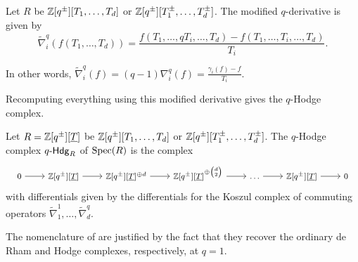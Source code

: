 \begin{definition}\label{def: modified q-derivative}
    Let $R$ be $\mathbb{Z}[q^{\pm}][T_{1},\dots,T_{d}]$ or $\mathbb{Z}[q^{\pm}][T_{1}^{\pm},\dots,T_{d}^{\pm}]$. The modified $q$-derivative is given by 
    $$\widetilde{\nabla}_{i}^{q}(f(T_{1},\dots,T_{d}))=\frac{f(T_{1},\dots,qT_{i},\dots,T_{d})-f(T_{1},\dots,T_{i},\dots,T_{d})}{T_{i}}.$$
\end{definition}
\begin{remark}
    In other words, $\widetilde{\nabla}_{i}^{q}(f)=(q-1)\nabla_{i}^{q}(f)=\frac{\gamma_{i}(f)-f}{T_{i}}$.  
\end{remark}
Recomputing everything using this modified derivative gives the $q$-Hodge complex. 
\begin{definition}\label{def: q-Hodge complex}
    Let $R=\mathbb{Z}[q^{\pm}][\underline{T}]$ be $\mathbb{Z}[q^{\pm}][T_{1},\dots,T_{d}]$ or $\mathbb{Z}[q^{\pm}][T_{1}^{\pm},\dots,T_{d}^{\pm}]$. The $q$-Hodge complex $q\text{-}\mathsf{Hdg}_{R}$ of $\operatorname{Spec}(R)$ is the complex
    \begin{equation}\label{eqn: q-Hodge complex of R}
    \footnotesize
    \begin{tikzcd}
        0 & {\ZZ[q^{\pm}][\underline{T}]} & {\ZZ[q^{\pm}][\underline{T}]^{\oplus d}} & {\ZZ[q^{\pm}][\underline{T}]^{\oplus\binom{d}{2}}} & \dots & {\ZZ[q^{\pm}][\underline{T}]} & 0
        \arrow[from=1-1, to=1-2]
        \arrow[from=1-2, to=1-3]
        \arrow[from=1-3, to=1-4]
        \arrow[from=1-4, to=1-5]
        \arrow[from=1-5, to=1-6]
        \arrow[from=1-6, to=1-7]
    \end{tikzcd}
    \normalsize
    \end{equation}
    with differentials given by the differentials for the Koszul complex of commuting operators $\widetilde{\nabla}_{1}^{1},\dots,\widetilde{\nabla}_{d}^{q}$. 
\end{definition}
\begin{remark}
    The nomenclature of  are justified by the fact that they recover the ordinary de Rham and Hodge complexes, respectively, at $q=1$.
\end{remark} 
